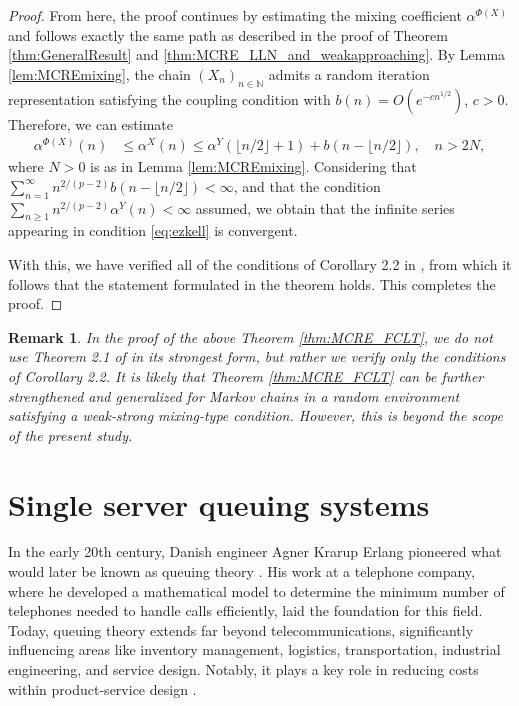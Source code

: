 \documentclass[a4paper,10pt]{article}
\newtheorem{remark}[theorem]{Remark}
\begin{document}
\begin{proof}
	From here, the proof continues by estimating the mixing coefficient $\alpha^{\Phi(X)}$ and follows exactly the same path as described in the proof of Theorem \ref{thm:GeneralResult} and \ref{thm:MCRE_LLN_and_weakapproaching}.
	By Lemma \ref{lem:MCREmixing}, the chain $(X_n)_{n\in\mathbb{N}}$ admits a random iteration representation satisfying the coupling condition with $b(n)=O(e^{-cn^{1/2}})$, $c>0$. Therefore, we can estimate
	\begin{align*}
	\alpha^{\Phi(X)}(n) &\le \alpha^{X}(n) \le \alpha^{Y} (\lfloor n/2\rfloor +1) + b(n-\lfloor n/2\rfloor), 
	\quad n > 2N,
	\end{align*}
	where $N>0$ is as in Lemma \ref{lem:MCREmixing}. Considering that $\sum_{n=1}^{\infty} n^{2/(p-2)} b(n-\lfloor n/2\rfloor) < \infty$, and that the condition $\sum_{n\ge 1} n^{2/(p-2)}\alpha^Y(n) < \infty$ assumed, we obtain that the infinite series appearing in condition \eqref{eq:ezkell} is convergent.
	
	With this, we have verified all of the conditions of Corollary 2.2 in \cite{merlevede2020functional}, from which it follows that the statement formulated in the theorem holds. This completes the proof.
	
\end{proof}

\begin{remark}
In the proof of the above Theorem \ref{thm:MCRE_FCLT}, we do not use Theorem 2.1 of \cite{merlevede2020functional} in its strongest form, but rather we verify only the conditions of Corollary 2.2. It is likely that Theorem \ref{thm:MCRE_FCLT} can be further strengthened and generalized for Markov chains in a random environment satisfying a weak-strong mixing-type condition. However, this is beyond the scope of the present study.
\end{remark}


\section{Single server queuing systems}\label{sec:queuing}


In the early 20th century, Danish engineer Agner Krarup Erlang pioneered what would later be known as queuing theory \cite{erlang1909}. His work at a telephone company, where he developed a mathematical model to determine the minimum number of telephones needed to handle calls efficiently, laid the foundation for this field. Today, queuing theory extends far beyond telecommunications, significantly influencing areas like inventory management, logistics, transportation, industrial engineering, and service design. Notably, it plays a key role in reducing costs within product-service design \cite{Nguyen2017}.
\end{document}
